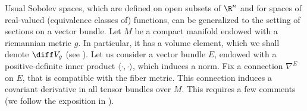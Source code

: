 

Usual Sobolev spaces, which are defined on open subsets of \(\R^n\) and for spaces of real-valued (equivalence classes of) functions, can be generalized to the setting of sections on a vector bundle. Let \(M\) be a compact manifold endowed with a riemannian metric \(g\). In particular, it has a volume element, which we shall denote \(\diff V_g\) (see \parencite[Chapter 2]{lee_introRM}). Let us consider a vector bundle \(E\), endowed with a positive-definite inner product \(\langle \cdot, \cdot \rangle\), which induces a norm. Fix a connection \(\nabla^E\) on \(E\), that is compatible with the fiber metric. This connection induces a covariant derivative in all tensor bundles over \(M\). This requires a few comments (we follow the exposition in \parencite{wehrheim2004uhlenbeck}). \\

